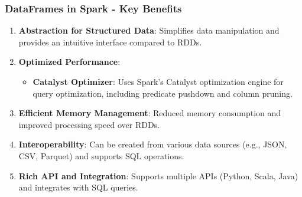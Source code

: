 \documentclass[aspectratio=169]{beamer}
\begin{document}
\begin{frame}[fragile]
    \frametitle{DataFrames in Spark - Key Benefits}
    \begin{enumerate}
        \item \textbf{Abstraction for Structured Data}: Simplifies data manipulation and provides an intuitive interface compared to RDDs.
        
        \item \textbf{Optimized Performance}:
            \begin{itemize}
                \item \textbf{Catalyst Optimizer}: Uses Spark’s Catalyst optimization engine for query optimization, including predicate pushdown and column pruning.
            \end{itemize}
            
        \item \textbf{Efficient Memory Management}: Reduced memory consumption and improved processing speed over RDDs.
        
        \item \textbf{Interoperability}: Can be created from various data sources (e.g., JSON, CSV, Parquet) and supports SQL operations.

        \item \textbf{Rich API and Integration}: Supports multiple APIs (Python, Scala, Java) and integrates with SQL queries.
    \end{enumerate}
\end{frame}
\end{document}
